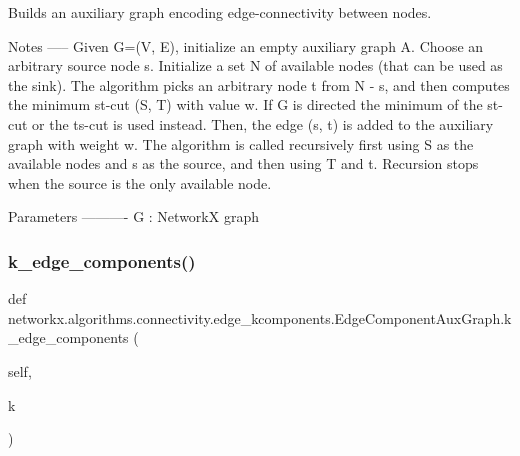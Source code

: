 \begin{DoxyVerb}Builds an auxiliary graph encoding edge-connectivity between nodes.

Notes
-----
Given G=(V, E), initialize an empty auxiliary graph A.
Choose an arbitrary source node s.  Initialize a set N of available
nodes (that can be used as the sink). The algorithm picks an
arbitrary node t from N - {s}, and then computes the minimum st-cut
(S, T) with value w. If G is directed the minimum of the st-cut or
the ts-cut is used instead. Then, the edge (s, t) is added to the
auxiliary graph with weight w. The algorithm is called recursively
first using S as the available nodes and s as the source, and then
using T and t. Recursion stops when the source is the only available
node.

Parameters
----------
G : NetworkX graph
\end{DoxyVerb}
 \mbox{\label{classnetworkx_1_1algorithms_1_1connectivity_1_1edge__kcomponents_1_1EdgeComponentAuxGraph_a7384a832c991efc3144d5da40f7731a2}} 
\subsubsection{\texorpdfstring{k\+\_\+edge\+\_\+components()}{k\_edge\_components()}}
{\footnotesize\ttfamily def networkx.\+algorithms.\+connectivity.\+edge\+\_\+kcomponents.\+Edge\+Component\+Aux\+Graph.\+k\+\_\+edge\+\_\+components (\begin{DoxyParamCaption}\item[{}]{self,  }\item[{}]{k }\end{DoxyParamCaption})}

